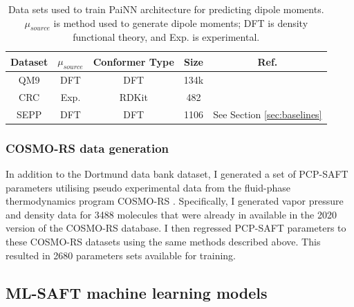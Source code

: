 \begin{table}[]
    \centering
    \caption{Data sets used to train PaiNN architecture for predicting dipole moments. $\mu_{source}$ is method used to generate dipole moments; DFT is density functional theory, and Exp. is experimental.}
    \begin{tabular}{ccccc}
         Dataset & $\mu_{source}$ & Conformer Type & Size & Ref.  \\
         \hline
         QM9 & DFT & DFT & 134k & \cite{Ramakrishnan2014}\\
         CRC & Exp. & RDKit\cite{Wang2020} & 482 & \cite{CRC2014} \\
         SEPP & DFT & DFT & 1106 & See Section \ref{sec:baselines} \\
         \hline
    \end{tabular}

    \label{tab:painn_data}
\end{table}

\subsubsection{COSMO-RS data generation}

In addition to the Dortmund data bank dataset, I generated a set of PCP-SAFT parameters utilising pseudo experimental data from the fluid-phase thermodynamics program COSMO-RS \cite{Klamt2010}. Specifically, I generated vapor pressure and density data for 3488 molecules that were already in available in the 2020 version of the COSMO-RS database. I then regressed PCP-SAFT parameters to these COSMO-RS datasets using the same methods described above. This resulted in 2680 parameters sets available for training.

\subsection{ML-SAFT machine learning models}\label{subsec:ML-SAFT_model}

